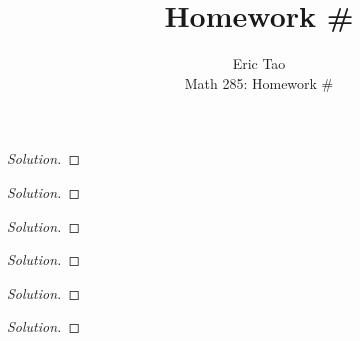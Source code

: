 \documentclass[10pt]{article}
\newenvironment{problem}[2][]{\begin{trivlist}
\item[\hskip \labelsep {\bfseries #1}\hskip \labelsep {\bfseries #2.}]}{\end{trivlist}}
\begin{document}
 
\title{Homework \#}
\author{Eric Tao\\
Math 285: Homework \#}
\maketitle

\begin{problem}{Question 1}

\end{problem}

\begin{proof}[Solution]
\end{proof}

\begin{problem}{Question 2}


\end{problem}

\begin{proof}[Solution]

\end{proof}

\begin{problem}{Question 3}


\end{problem}

\begin{proof}[Solution]


\end{proof}

\begin{problem}{Question 4}



\end{problem}

\begin{proof}[Solution]


\end{proof}

\begin{problem}{Question 5}

\end{problem}

\begin{proof}[Solution]

\end{proof}



\begin{problem}{Question 6}


\end{problem}

\begin{proof}[Solution]

\end{proof}
\end{document}
